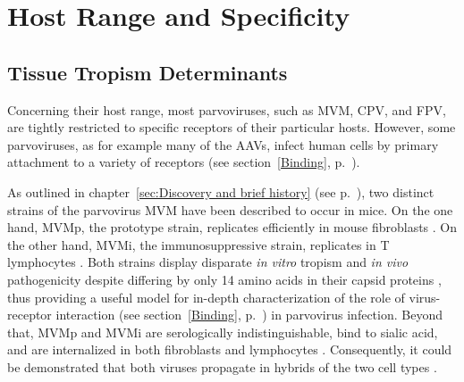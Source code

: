 
\chapter{Host Range and Specificity} %

\label{Chapter6} %



\section{Tissue Tropism Determinants}

Concerning their host range, most parvoviruses, such as MVM,  CPV,  and FPV,  are tightly restricted to specific receptors of their particular hosts. However, some parvoviruses, as for example many of the AAVs,  infect human cells by primary attachment to a variety of receptors (see section~\ref{Binding}, p.~\pageref{Binding}). 

As outlined in chapter~\ref{sec:Discovery and brief history} (see p.~\pageref{sec:Discovery and brief history}), two distinct strains of the parvovirus MVM have been described to occur in mice. On the one hand, MVMp,  the prototype strain, replicates efficiently in mouse fibroblasts \cite{pmid5945715}. On the other hand, MVMi, the immunosuppressive strain, replicates in T lymphocytes \cite{pmid1244418, pmid6264106}.
Both strains display disparate \textit{in vitro} tropism and \textit{in vivo} pathogenicity despite differing by only 14 amino acids in their capsid proteins \cite{pmid1871965}, thus providing a useful model for in-depth characterization of the role of virus-receptor interaction (see section~\ref{Binding}, p.~\pageref{Binding}) in parvovirus infection. Beyond that, MVMp and MVMi are serologically indistinguishable, bind to sialic acid, and are internalized in both fibroblasts and lymphocytes \cite{pmid6602221}. Consequently, it could be demonstrated that both viruses propagate in hybrids of the two cell types \cite{pmid6602222}.    

